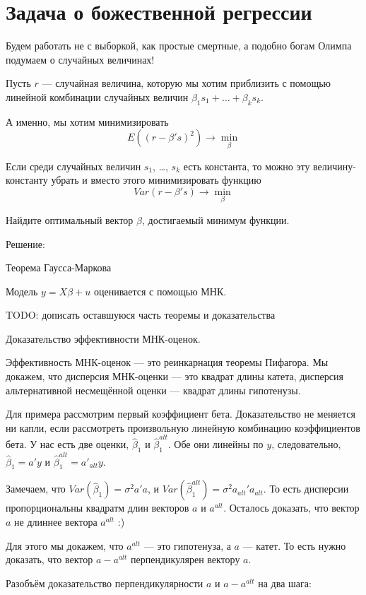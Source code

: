 \documentclass[11pt,russian,]{book}
\begin{document}
\hypertarget{divine_regression}{%
\section{Задача о божественной регрессии}\label{divine_regression}}

Будем работать не с выборкой, как простые смертные, а подобно богам Олимпа подумаем о случайных величинах!

Пусть \(r\) --- случайная величина, которую мы хотим приблизить с помощью линейной комбинации случайных величин \(\beta_1 s_1 + \ldots + \beta_k s_k\).

А именно, мы хотим минимизировать
\[
E((r - \beta's)^2) \to \min_{\beta} 
\]

Если среди случайных величин \(s_1\), \ldots, \(s_k\) есть константа, то можно эту величину-константу убрать и вместо этого минимизировать функцию
\[
Var(r-\beta's) \to \min_{\beta}
\]

Найдите оптимальный вектор \(\beta\), достигаемый минимум функции.

Решение:

Теорема Гаусса-Маркова

Модель \(y = X\beta + u\) оценивается с помощью МНК.

TODO: дописать оставшуюся часть теоремы и доказательства

Доказательство эффективности МНК-оценок.

Эффективность МНК-оценок --- это реинкарнация теоремы Пифагора.
Мы докажем, что дисперсия МНК-оценки --- это квадрат длины катета,
дисперсия альтернативной несмещённой оценки --- квадрат длины гипотенузы.

Для примера рассмотрим первый коэффициент бета. Доказательство не меняется ни капли, если рассмотреть произвольную линейную комбинацию коэффициентов бета.
У нас есть две оценки, \(\hat\beta_1\) и \(\hat\beta_1^{alt}\). Обе они линейны по \(y\),
следовательно, \(\hat\beta_1 = a'y\) и \(\hat\beta_1^{alt} = a'_{alt} y\).

Замечаем, что \(Var(\hat\beta_1) = \sigma^2 a'a\), и \(Var(\hat\beta_1^{alt}) = \sigma^2 a_{alt}'a_{alt}\). То есть дисперсии пропорциональны квадратм длин векторов \(a\) и \(a^{alt}\).
Осталось доказать, что вектор \(a\) не длиннее вектора \(a^{alt}\) :)

Для этого мы докажем, что \(a^{alt}\) --- это гипотенуза, а \(a\) --- катет. То есть нужно доказать, что вектор \(a - a^{alt}\) перпендикулярен вектору \(a\).

Разобъём доказательство перпендикулярности \(a\) и \(a-a^{alt}\) на два шага:
\end{document}
